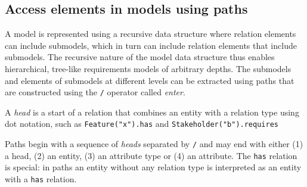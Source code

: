 \documentclass[11pt]{article}
\begin{document}
\subsection{Access elements in models using paths}

A model is represented using a recursive data structure where relation elements can include submodels, which in turn can include relation elements that include submodels. The recursive nature of the model data structure thus enables hierarchical, tree-like requirements models of arbitrary depths. The submodels and elements of submodels at different levels can be extracted using paths that are constructed using the \verb+/+ operator called {\it enter}. 

A {\it head} is a start of a relation that combines an entity with a relation type using dot notation, such as  
\verb+Feature("x").has+ and \verb+Stakeholder("b").requires+  

Paths begin with a sequence of {\it heads} separated by \verb+/+ and may end with either (1) a head, (2) an entity, (3) an attribute type or (4) an attribute. The \verb+has+ relation is special: in paths an entity without any relation type is interpreted as an entity with a \verb+has+ relation. 
\end{document}
